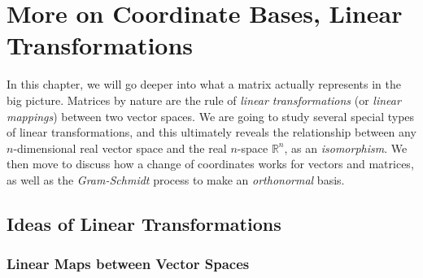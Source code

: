 \chapter{More on Coordinate Bases, Linear Transformations}
\label{chap:6x}

In this chapter, we will go deeper into what a matrix actually represents in the big picture. Matrices by nature are the rule of \textit{linear transformations} (or \textit{linear mappings}) between two vector spaces. We are going to study several special types of linear transformations, and this ultimately reveals the relationship between any $n$-dimensional real vector space and the real $n$-space $\mathbb{R}^n$, as an \textit{isomorphism}. We then move to discuss how a change of coordinates works for vectors and matrices, as well as the \textit{Gram-Schmidt} process to make an \textit{orthonormal} basis.

\section{Ideas of Linear Transformations}
\label{section:lineartrans}

\subsection{Linear Maps between Vector Spaces}

